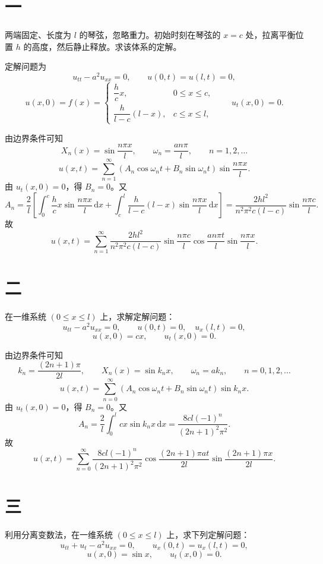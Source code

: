 \documentclass[UTF8,zihao=-4]{ctexart}
\begin{document}
\section*{一}

两端固定、长度为 $l$ 的琴弦，忽略重力。初始时刻在琴弦的 $x=c$ 处，拉离平衡位置 $h$ 的高度，然后静止释放。求该体系的定解。

定解问题为
\[
u_{tt}-a^2u_{xx}=0,\qquad u(0,t)=u(l,t)=0,
\]
\[
u(x,0)=f(x)=
\begin{cases}
\dfrac{h}{c}x,&0\le x\le c,\\[4pt]
\dfrac{h}{l-c}(l-x),&c\le x\le l,
\end{cases}
\qquad u_t(x,0)=0.
\]

由边界条件可知
\[
X_n(x)=\sin\dfrac{n\pi x}{l},\qquad \omega_n=\dfrac{an\pi}{l},
\qquad n=1,2,\dots
\]
\[
u(x,t)=\sum_{n=1}^{\infty}(A_n\cos\omega_n t+B_n\sin\omega_n t)
\sin\dfrac{n\pi x}{l}.
\]
由 $u_t(x,0)=0$，得 $B_n=0$。又
\[
A_n=\dfrac{2}{l}\left[
\int_0^c\dfrac{h}{c}x\sin\dfrac{n\pi x}{l}\,\mathrm{d}x
+\int_c^l\dfrac{h}{l-c}(l-x)\sin\dfrac{n\pi x}{l}\,\mathrm{d}x
\right]
=\dfrac{2hl^2}{n^2\pi^2c(l-c)}\sin\dfrac{n\pi c}{l}.
\]
故
\[
u(x,t)=\sum_{n=1}^{\infty}
\dfrac{2hl^2}{n^2\pi^2c(l-c)}\sin\dfrac{n\pi c}{l}
\cos\dfrac{an\pi t}{l}\sin\dfrac{n\pi x}{l}.
\]

\section*{二}

在一维系统 $(0\le x\le l)$ 上，求解定解问题：
\[
u_{tt}-a^2u_{xx}=0,\qquad
u(0,t)=0,\quad u_x(l,t)=0,
\]
\[
u(x,0)=cx,\qquad u_t(x,0)=0.
\]

由边界条件可知
\[
k_n=\dfrac{(2n+1)\pi}{2l},\qquad X_n(x)=\sin k_nx,\qquad
\omega_n=ak_n,\qquad n=0,1,2,\dots
\]
\[
u(x,t)=\sum_{n=0}^{\infty}(A_n\cos\omega_nt+B_n\sin\omega_nt)\sin k_nx.
\]
由 $u_t(x,0)=0$，得 $B_n=0$。又
\[
A_n=\dfrac{2}{l}\int_0^lcx\sin k_nx\,\mathrm{d}x
=\dfrac{8cl(-1)^n}{(2n+1)^2\pi^2}.
\]
故
\[
u(x,t)=\sum_{n=0}^{\infty}
\dfrac{8cl(-1)^n}{(2n+1)^2\pi^2}
\cos\dfrac{(2n+1)\pi at}{2l}\sin\dfrac{(2n+1)\pi x}{2l}.
\]

\section*{三}

利用分离变数法，在一维系统 $(0\le x\le l)$ 上，求下列定解问题：
\[
u_{tt}+u_t-a^2u_{xx}=0,\qquad
u_x(0,t)=u_x(l,t)=0,
\]
\[
u(x,0)=\sin x,\qquad u_t(x,0)=0.
\]
\end{document}
